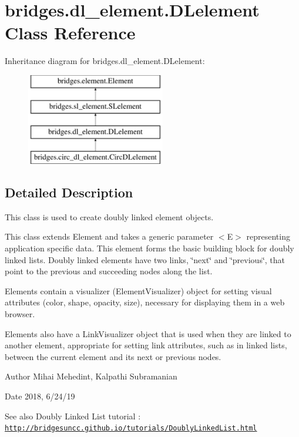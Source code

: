 \hypertarget{classbridges_1_1dl__element_1_1_d_lelement}{}\section{bridges.\+dl\+\_\+element.\+D\+Lelement Class Reference}
\label{classbridges_1_1dl__element_1_1_d_lelement}
Inheritance diagram for bridges.\+dl\+\_\+element.\+D\+Lelement\+:\begin{figure}[H]
\begin{center}
\leavevmode
\includegraphics[height=4.000000cm]{classbridges_1_1dl__element_1_1_d_lelement}
\end{center}
\end{figure}


\subsection{Detailed Description}
This class is used to create doubly linked element objects. 

This class extends Element and takes a generic parameter $<$\+E$>$ representing application specific data. This element forms the basic building block for doubly linked lists. Doubly linked elements have two links, \char`\"{}next\char`\"{} and \char`\"{}previous\char`\"{}, that point to the previous and succeeding nodes along the list.

Elements contain a visualizer (Element\+Visualizer) object for setting visual attributes (color, shape, opacity, size), necessary for displaying them in a web browser.

Elements also have a Link\+Visualizer object that is used when they are linked to another element, appropriate for setting link attributes, such as in linked lists, between the current element and its next or previous nodes.

\begin{DoxyAuthor}{Author}
Mihai Mehedint, Kalpathi Subramanian 
\end{DoxyAuthor}
\begin{DoxyDate}{Date}
2018, 6/24/19
\end{DoxyDate}
\begin{DoxySeeAlso}{See also}
Doubly Linked List tutorial \+: \href{http://bridgesuncc.github.io/tutorials/DoublyLinkedList.html}{\tt http\+://bridgesuncc.\+github.\+io/tutorials/\+Doubly\+Linked\+List.\+html} 
\end{DoxySeeAlso}
